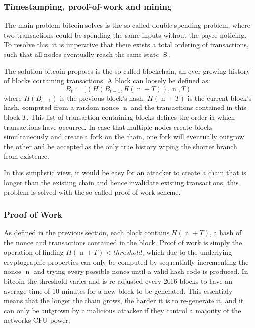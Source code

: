 \documentclass[12pt,msc,a4paper,oneside]{ucl_thesis}
\DeclareMathOperator{\Btcstate}{S}
\DeclareMathOperator{\nonce}{n}
\begin{document}
\subsubsection{Timestamping, proof-of-work and mining}
The main problem bitcoin solves is the so called double-spending problem, where two transactions could be spending the same inputs without the payee noticing. To resolve this, it is imperative that there exists a total ordering of transactions, such that all nodes eventually reach the same state $\Btcstate$.

The solution bitcoin proposes is the so-called blockchain, an ever growing history of blocks containing transactions. A block can loosely be defined as:
\begin{equation}
    B_t := ((H(B_{t-1}, H(\nonce + T)), \nonce, T)
\end{equation}
where $H(B_{t-1})$ is the previous block's hash, $H(\nonce + T)$ is the current block's hash, computed from a random nonce $\nonce$ and the transactions contained in this block $T$. This list of transaction containing blocks defines the order in which transactions have occurred. In case that multiple nodes create blocks simultaneously and create a fork on the chain, one fork will eventually outgrow the other and be accepted as the only true history wiping the shorter branch from existence.

In this simplistic view, it would be easy for an attacker to create a chain that is longer than the existing chain and hence invalidate existing transactions, this problem is solved with the so-called proof-of-work scheme.

\subsubsection{Proof of Work} \label{sec:background_bitcoin:proof_of_work}
As defined in the previous section, each block contains $H(\nonce + T)$, a hash of the nonce and transactions contained in the block. Proof of work is simply the operation of finding $H(\nonce + T) < threshold$, which due to the underlying cryptographic properties can only be computed by sequentially incrementing the nonce $\nonce$ and trying every possible nonce until a valid hash code is produced. In bitcoin the threshold varies and is re-adjusted every 2016 blocks to have an average time of 10 minutes for a new block to be generated. This essentialy means that the longer the chain grows, the harder it is to re-generate it, and it can only be outgrown by a malicious attacker if they control a majority of the networks CPU power.
\end{document}
